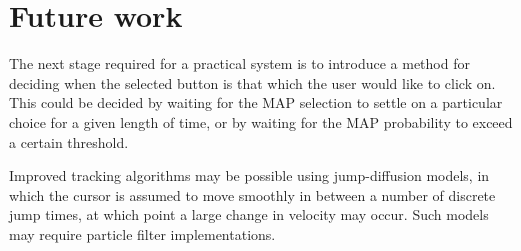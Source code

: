 \section{Future work}
The next stage required for a practical system is to introduce a method for deciding when the selected button is that which the user would like to click on. This could be decided by waiting for the MAP selection to settle on a particular choice for a given length of time, or by waiting for the MAP probability to exceed a certain threshold.

Improved tracking algorithms may be possible using jump-diffusion models, in which the cursor is assumed to move smoothly in between a number of discrete jump times, at which point a large change in velocity may occur. Such models may require particle filter implementations.
